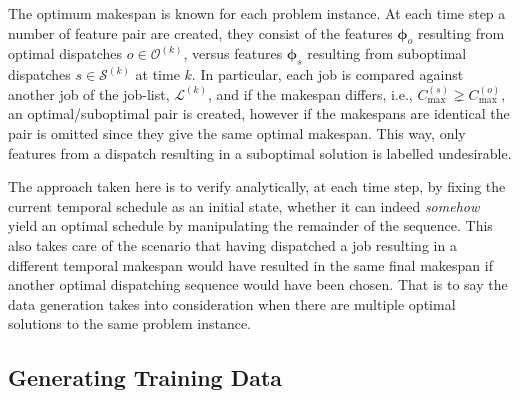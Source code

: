 \documentclass[smallextended]{svjour3}
\renewcommand{\vphi}{\bm{\phi}}
\begin{document}
The optimum makespan is known for each problem instance. At each time step a 
number of feature pair are created, they consist of the features $\vphi_o$ 
resulting from optimal dispatches $o\in\mathcal{O}^{(k)}$, versus features 
$\vphi_s$ resulting from suboptimal dispatches $s\in\mathcal{S}^{(k)}$ at time 
$k$. %
In particular, each job is compared against another job of the job-list, 
$\mathcal{L}^{(k)}$, and if the makespan differs, i.e., $C_{\max}^{(s)}\gneq 
C_{\max}^{(o)}$, an optimal/suboptimal pair is created, however if the 
makespans are identical the pair is omitted since they give the same optimal 
makespan. This way, only features from a dispatch resulting in a suboptimal 
solution is labelled undesirable.

The approach taken here is to verify analytically, at each time step, by fixing 
the current temporal schedule as an initial state, whether it can indeed 
\emph{somehow} yield an optimal schedule by manipulating the remainder of the 
sequence. This also takes care of the scenario that having dispatched a job 
resulting in a different temporal makespan would have resulted in the same 
final makespan if another optimal dispatching sequence would have been chosen. 
That is to say the data generation takes into consideration when there are 
multiple optimal solutions to the same problem instance. 

\subsection{Generating Training Data}\label{sec:gentrdata}
\end{document}
